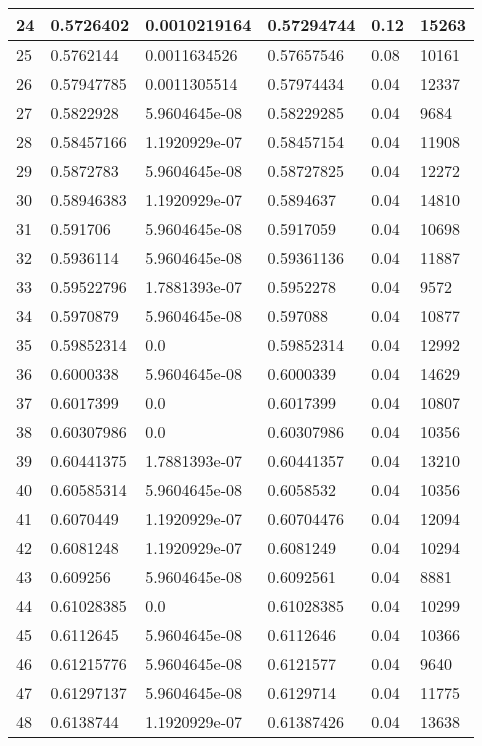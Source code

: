\begin{longtable}{|l|l|l|l|l|l|}
24 & 0.5726402 & 0.0010219164 & 0.57294744 & 0.12 & 15263 \\ \hline 
25 & 0.5762144 & 0.0011634526 & 0.57657546 & 0.08 & 10161 \\ \hline 
26 & 0.57947785 & 0.0011305514 & 0.57974434 & 0.04 & 12337 \\ \hline 
27 & 0.5822928 & 5.9604645e-08 & 0.58229285 & 0.04 & 9684 \\ \hline 
28 & 0.58457166 & 1.1920929e-07 & 0.58457154 & 0.04 & 11908 \\ \hline 
29 & 0.5872783 & 5.9604645e-08 & 0.58727825 & 0.04 & 12272 \\ \hline 
30 & 0.58946383 & 1.1920929e-07 & 0.5894637 & 0.04 & 14810 \\ \hline 
31 & 0.591706 & 5.9604645e-08 & 0.5917059 & 0.04 & 10698 \\ \hline 
32 & 0.5936114 & 5.9604645e-08 & 0.59361136 & 0.04 & 11887 \\ \hline 
33 & 0.59522796 & 1.7881393e-07 & 0.5952278 & 0.04 & 9572 \\ \hline 
34 & 0.5970879 & 5.9604645e-08 & 0.597088 & 0.04 & 10877 \\ \hline 
35 & 0.59852314 & 0.0 & 0.59852314 & 0.04 & 12992 \\ \hline 
36 & 0.6000338 & 5.9604645e-08 & 0.6000339 & 0.04 & 14629 \\ \hline 
37 & 0.6017399 & 0.0 & 0.6017399 & 0.04 & 10807 \\ \hline 
38 & 0.60307986 & 0.0 & 0.60307986 & 0.04 & 10356 \\ \hline 
39 & 0.60441375 & 1.7881393e-07 & 0.60441357 & 0.04 & 13210 \\ \hline 
40 & 0.60585314 & 5.9604645e-08 & 0.6058532 & 0.04 & 10356 \\ \hline 
41 & 0.6070449 & 1.1920929e-07 & 0.60704476 & 0.04 & 12094 \\ \hline 
42 & 0.6081248 & 1.1920929e-07 & 0.6081249 & 0.04 & 10294 \\ \hline 
43 & 0.609256 & 5.9604645e-08 & 0.6092561 & 0.04 & 8881 \\ \hline 
44 & 0.61028385 & 0.0 & 0.61028385 & 0.04 & 10299 \\ \hline 
45 & 0.6112645 & 5.9604645e-08 & 0.6112646 & 0.04 & 10366 \\ \hline 
46 & 0.61215776 & 5.9604645e-08 & 0.6121577 & 0.04 & 9640 \\ \hline 
47 & 0.61297137 & 5.9604645e-08 & 0.6129714 & 0.04 & 11775 \\ \hline 
48 & 0.6138744 & 1.1920929e-07 & 0.61387426 & 0.04 & 13638 \\ \hline 

\end{longtable}
